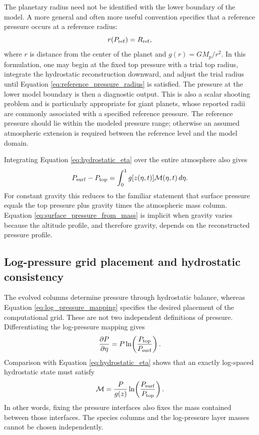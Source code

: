\documentclass[twocolumn]{aastex631}
\begin{document}
The planetary radius need not be identified with the lower boundary of the
model. A more general and often more useful convention specifies that a
reference pressure occurs at a reference radius:
\begin{equation}
  r(P_{\rm ref})=R_{\rm ref},
  \label{eq:reference_pressure_radius}
\end{equation}
where $r$ is distance from the center of the planet and
$g(r)=GM_p/r^2$. In this formulation, one may begin at the fixed top pressure
with a trial top radius, integrate the hydrostatic reconstruction downward,
and adjust the trial radius until Equation
\eqref{eq:reference_pressure_radius} is satisfied. The pressure at the lower
model boundary is then a diagnostic output. This is also a scalar shooting
problem and is particularly appropriate for giant planets, whose reported
radii are commonly associated with a specified reference pressure. The
reference pressure should lie within the modeled pressure range; otherwise an
assumed atmospheric extension is required between the reference level and the
model domain.

Integrating Equation \eqref{eq:hydrostatic_eta} over the entire atmosphere
also gives
\begin{equation}
  P_{\rm surf}-P_{\rm top}
  =\int_0^1 g[z(\eta,t)]\mathcal{M}(\eta,t)\,d\eta .
  \label{eq:surface_pressure_from_mass}
\end{equation}
For constant gravity this reduces to the familiar statement that surface
pressure equals the top pressure plus gravity times the atmospheric mass
column. Equation \eqref{eq:surface_pressure_from_mass} is implicit when
gravity varies because the altitude profile, and therefore gravity, depends
on the reconstructed pressure profile.

\subsection{Log-pressure grid placement and hydrostatic consistency}

The evolved columns determine pressure through hydrostatic balance, whereas
Equation \eqref{eq:log_pressure_mapping} specifies the desired placement of
the computational grid. These are not two independent definitions of
pressure. Differentiating the log-pressure mapping gives
\begin{equation}
  \frac{\partial P}{\partial\eta}
  =P\ln\!\left(\frac{P_{\rm top}}{P_{\rm surf}}\right).
  \label{eq:log_pressure_derivative}
\end{equation}
Comparison with Equation \eqref{eq:hydrostatic_eta} shows that an exactly
log-spaced hydrostatic state must satisfy
\begin{equation}
  \mathcal{M}
  =\frac{P}{g(z)}
  \ln\!\left(\frac{P_{\rm surf}}{P_{\rm top}}\right).
  \label{eq:log_pressure_mass_constraint}
\end{equation}
In other words, fixing the pressure interfaces also fixes the mass contained
between those interfaces. The species columns and the log-pressure layer
masses cannot be chosen independently.
\end{document}
